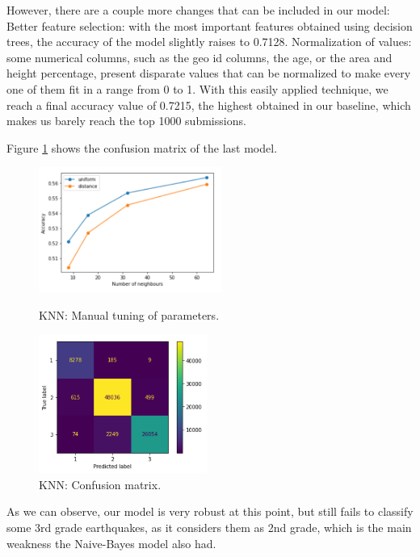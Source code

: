 However, there are a couple more changes that can be included in our model:
Better feature selection: with the most important features obtained using decision trees, the accuracy of the model slightly raises to 0.7128.
Normalization of values: some numerical columns, such as the geo id columns, the age, or the area and height percentage, present disparate values that can be normalized to make every one of them fit in a range from 0 to 1. With this easily applied technique, we reach a final accuracy value of 0.7215, the highest obtained in our baseline, which makes us barely reach the top 1000 submissions.

Figure \ref{PICTURE_figure_knn_02} shows the confusion matrix of the last model.

\begin{figure}[h!]
  \begin{minipage}[b]{0.5\linewidth}
    \centering
    \includegraphics[width=60mm]{images/knn_figure_01.png}
    \caption{KNN: Manual tuning of parameters.}
    \label{PICTURE_figure_knn_01}
    \end{minipage}
  \hspace{0.1cm}
  \begin{minipage}[b]{0.5\linewidth}
    \centering
    \includegraphics[width=55mm]{images/knn_figure_02.png}
    \caption{KNN: Confusion matrix.}
    \label{PICTURE_figure_knn_02}
  \end{minipage}
\end{figure}

As we can observe, our model is very robust at this point, but still fails to classify some 3rd grade earthquakes, as it considers them as 2nd grade, which is the main weakness the Naive-Bayes model also had.

